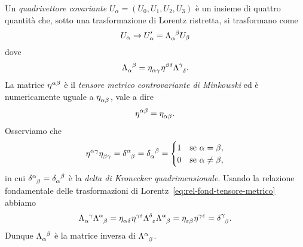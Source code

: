 Un \emph{quadrivettore covariante}
$U_{\alpha} = (U_{0}, U_{1}, U_{2}, U_{3})$ è un insieme di quattro quantità
che, sotto una trasformazione di Lorentz ristretta, si trasformano come
\begin{equation}
  U_{\alpha} \to U'_{\alpha} = \tensor{\Lambda}{_{\alpha}^{\beta}}U_{\beta}
\end{equation}
dove
\begin{equation}
  \tensor{\Lambda}{_{\alpha}^{\beta}} = \tensor{\eta}{_{\alpha\gamma}}
  \tensor{\eta}{^{\beta\delta}} \tensor{\Lambda}{^{\gamma}_{\delta}}.
\end{equation}
La matrice $\tensor{\eta}{^{\alpha\beta}}$ è il
\emph{tensore
  metrico controvariante di Minkowski}
ed è numericamente uguale a $\tensor{\eta}{_{\alpha\beta}}$, vale a dire
\begin{equation}
  \tensor{\eta}{^{\alpha\beta}} = \tensor{\eta}{_{\alpha\beta}}.
\end{equation}
Osserviamo che
\begin{equation}
  \tensor{\eta}{^{\alpha\gamma}} \tensor{\eta}{_{\beta\gamma}} =
  \tensor{\delta}{^{\alpha}_{\beta}} = \tensor{\delta}{_{\alpha}^{\beta}} =
  \begin{cases}
    1 & \text{se } \alpha = \beta, \\
    0 & \text{se } \alpha \neq \beta,
  \end{cases}
\end{equation}
in cui $\tensor{\delta}{^{\alpha}_{\beta}} = \tensor{\delta}{_{\alpha}^{\beta}}$
è la \emph{delta
  di Kronecker quadrimensionale}.
Usando la relazione fondamentale delle trasformazioni di
Lorentz~\eqref{eq:rel-fond-tensore-metrico} abbiamo
\begin{equation}
  \tensor{\Lambda}{_{\alpha}^{\gamma}} \tensor{\Lambda}{^{\alpha}_{\beta}} =
  \tensor{\eta}{_{\alpha\delta}} \tensor{\eta}{^{\gamma\epsilon}}
  \tensor{\Lambda}{^{\delta}_{\epsilon}} \tensor{\Lambda}{^{\alpha}_{\beta}} =
  \tensor{\eta}{_{\epsilon\beta}} \tensor{\eta}{^{\gamma\epsilon}} =
  \tensor{\delta}{^{\gamma}_{\beta}}.
\end{equation}
Dunque $\tensor{\Lambda}{_{\alpha}^{\beta}}$ è la matrice inversa di
$\tensor{\Lambda}{^{\alpha}_{\beta}}$.

